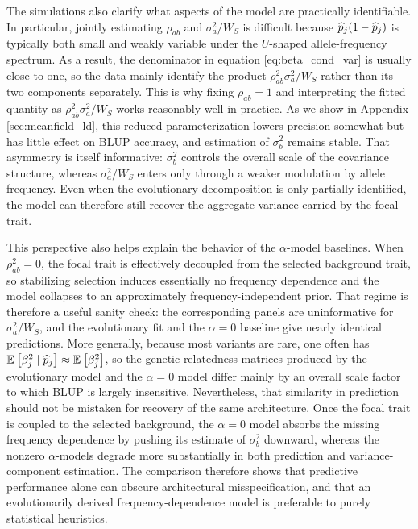 \documentclass[10pt]{article}
\begin{document}
The simulations also clarify what aspects of the model are practically identifiable. In particular, jointly estimating $\rho_{ab}$ and $\sigma_a^2/W_S$ is difficult because $\widehat{p}_j(1-\widehat{p}_j)$ is typically both small and weakly variable under the $U$-shaped allele-frequency spectrum. As a result, the denominator in equation \eqref{eq:beta_cond_var} is usually close to one, so the data mainly identify the product $\rho_{ab}^2 \sigma_a^2 / W_S$ rather than its two components separately. This is why fixing $\rho_{ab}=1$ and interpreting the fitted quantity as $\rho_{ab}^2 \sigma_a^2/W_S$ works reasonably well in practice. As we show in Appendix \ref{sec:meanfield_ld}, this reduced parameterization lowers precision somewhat but has little effect on BLUP accuracy, and estimation of $\sigma_b^2$ remains stable. That asymmetry is itself informative: $\sigma_b^2$ controls the overall scale of the covariance structure, whereas $\sigma_a^2/W_S$ enters only through a weaker modulation by allele frequency. Even when the evolutionary decomposition is only partially identified, the model can therefore still recover the aggregate variance carried by the focal trait.

This perspective also helps explain the behavior of the $\alpha$-model baselines. When $\rho_{ab}^2=0$, the focal trait is effectively decoupled from the selected background trait, so stabilizing selection induces essentially no frequency dependence and the model collapses to an approximately frequency-independent prior. That regime is therefore a useful sanity check: the corresponding panels are uninformative for $\sigma_a^2/W_S$, and the evolutionary fit and the $\alpha=0$ baseline give nearly identical predictions. More generally, because most variants are rare, one often has $\mathbb{E}_{}\left[\beta_j^2 \mid \widehat{p}_j\right] \approx \mathbb{E}_{}\left[\beta_j^2\right]$, so the genetic relatedness matrices produced by the evolutionary model and the $\alpha=0$ model differ mainly by an overall scale factor to which BLUP is largely insensitive. 
Nevertheless, that similarity in prediction should not be mistaken for recovery of the same architecture. Once the focal trait is coupled to the selected background, the $\alpha=0$ model absorbs the missing frequency dependence by pushing its estimate of $\sigma_b^2$ downward, whereas the nonzero $\alpha$-models degrade more substantially in both prediction and variance-component estimation. The comparison therefore shows that predictive performance alone can obscure architectural misspecification, and that an evolutionarily derived frequency-dependence model is preferable to purely statistical heuristics.
\end{document}
